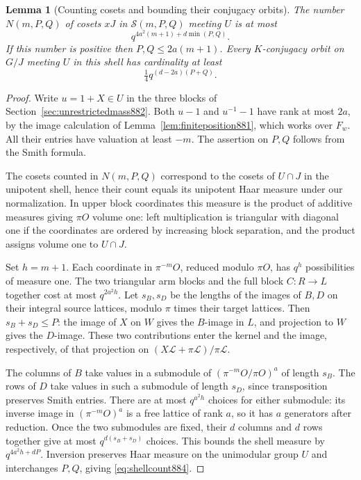\documentclass[a4paper,11pt]{article}
\newtheorem{lemma}[proposition]{Lemma}
\theoremstyle{definition}
\theoremstyle{remark}
\numberwithin{equation}{section}
\begin{document}
\begin{lemma}[Counting cosets and bounding their conjugacy orbits]
\leavevmode\label{lem:shellorbits884}
The number \(N(m,P,Q)\) of cosets \(xJ\) in \(\mathcal S(m,P,Q)\)
meeting \(U\) is at most
\begin{equation}
         q^{4a^2(m+1)+d\min(P,Q)} .
 \label{eq:shellcount884}
\end{equation}
If this number is positive then \(P,Q\le2a(m+1)\). Every
\(K\)-conjugacy orbit on \(G/J\) meeting \(U\) in this shell
has cardinality at least
\begin{equation}
              \tfrac14 q^{(d-2a)(P+Q)}.
 \label{eq:shellorbit884}
\end{equation}
\end{lemma}
\begin{proof}
Write \(u=1+X\in U\) in the three blocks of
Section~\ref{sec:unrestrictedmass882}. Both \(u-1\) and \(u^{-1}-1\)
have rank at most \(2a\), by the image calculation of
Lemma~\ref{lem:finiteposition881}, which works over \(F_w\).
All their entries have valuation at least \(-m\). The assertion
on \(P,Q\) follows from the Smith formula.

The cosets counted in \(N(m,P,Q)\) correspond to the cosets of
\(U\cap J\) in the unipotent shell, hence their count equals its
unipotent Haar measure under our normalization. In upper block
coordinates this measure is the product of additive measures
giving \(\pi O\) volume one: left multiplication is triangular
with diagonal one if the coordinates are ordered by increasing
block separation, and the product assigns volume one to \(U\cap J\).

Set \(h=m+1\). Each coordinate in \(\pi^{-m}O\), reduced modulo
\(\pi O\), has \(q^h\) possibilities of measure one. The two
triangular arm blocks and the full block \(C:R\to L\) together
cost at most \(q^{2a^2h}\). Let \(s_B,s_D\) be the lengths
of the images of \(B,D\) on their integral source lattices,
modulo \(\pi\) times their target lattices. Then
\(s_B+s_D\le P\): the image of \(X\) on \(W\) gives the
\(B\)-image in \(L\), and projection to \(W\) gives the
\(D\)-image. These two contributions enter the kernel and the
image, respectively, of that projection on
\((X\mathcal L+\pi\mathcal L)/\pi\mathcal L\).

The columns of \(B\) take values in a submodule of
\((\pi^{-m}O/\pi O)^a\) of length \(s_B\). The rows of \(D\) take
values in such a submodule of length \(s_D\), since transposition
preserves Smith entries. There are at most \(q^{a^2h}\) choices
for either submodule: its inverse image in \((\pi^{-m}O)^a\)
is a free lattice of rank \(a\), so it has \(a\) generators
after reduction. Once the two submodules are fixed, their \(d\)
columns and \(d\) rows together give at most \(q^{d(s_B+s_D)}\)
choices. This bounds the shell measure by \(q^{4a^2h+dP}\).
Inversion preserves Haar measure on the unimodular group \(U\)
and interchanges \(P,Q\), giving \eqref{eq:shellcount884}.


\end{proof}
\end{document}
